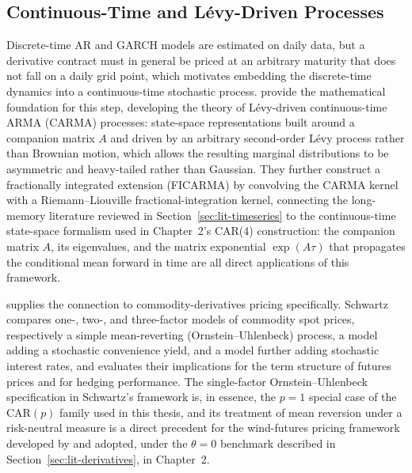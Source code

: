 \documentclass[11pt, a4paper, twoside]{article}
\begin{document}
\subsection{Continuous-Time and Lévy-Driven Processes}
\label{sec:lit-continuous}

Discrete-time AR and GARCH models are estimated on daily data, but a derivative contract must in general be priced at an arbitrary maturity that does not fall on a daily grid point, which motivates embedding the discrete-time dynamics into a continuous-time stochastic process. \citet{BrockwellMarquardt2005} provide the mathematical foundation for this step, developing the theory of Lévy-driven continuous-time ARMA (CARMA) processes: state-space representations built around a companion matrix $A$ and driven by an arbitrary second-order Lévy process rather than Brownian motion, which allows the resulting marginal distributions to be asymmetric and heavy-tailed rather than Gaussian. They further construct a fractionally integrated extension (FICARMA) by convolving the CARMA kernel with a Riemann--Liouville fractional-integration kernel, connecting the long-memory literature reviewed in Section~\ref{sec:lit-timeseries} to the continuous-time state-space formalism used in Chapter~2's CAR(4) construction: the companion matrix $A$, its eigenvalues, and the matrix exponential $\exp(A\tau)$ that propagates the conditional mean forward in time are all direct applications of this framework.

\citet{Schwartz1997} supplies the connection to commodity-derivatives pricing specifically. Schwartz compares one-, two-, and three-factor models of commodity spot prices, respectively a simple mean-reverting (Ornstein--Uhlenbeck) process, a model adding a stochastic convenience yield, and a model further adding stochastic interest rates, and evaluates their implications for the term structure of futures prices and for hedging performance. The single-factor Ornstein--Uhlenbeck specification in Schwartz's framework is, in essence, the $p=1$ special case of the CAR$(p)$ family used in this thesis, and its treatment of mean reversion under a risk-neutral measure is a direct precedent for the wind-futures pricing framework developed by \citet{BenthSaltyteBenth2009} and adopted, under the $\theta = 0$ benchmark described in Section~\ref{sec:lit-derivatives}, in Chapter~2.
\end{document}
